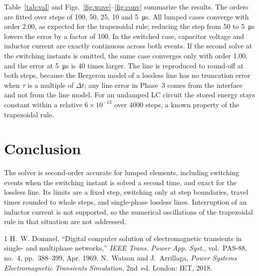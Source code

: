 \documentclass[conference]{IEEEtran}
\begin{document}
Table~\ref{tab:val} and Figs.~\ref{fig:wave}--\ref{fig:conv} summarize the results. The orders are fitted over steps of 100, 50, 25, 10 and \SI{5}{\micro\second}. All lumped cases converge with order 2.00, as expected for the trapezoidal rule; reducing the step from 50 to \SI{5}{\micro\second} lowers the error by a factor of 100. In the switched case, capacitor voltage and inductor current are exactly continuous across both events. If the second solve at the switching instants is omitted, the same case converges only with order 1.00, and the error at \SI{5}{\micro\second} is 40 times larger. The line is reproduced to round-off at both steps, because the Bergeron model of a lossless line has no truncation error when $\tau$ is a multiple of $\Delta t$; any line error in Phase~3 comes from the interface and not from the line model. For an undamped LC circuit the stored energy stays constant within a relative $6\times10^{-13}$ over 4000 steps, a known property of the trapezoidal rule.

\section{Conclusion}
The solver is second-order accurate for lumped elements, including switching events when the switching instant is solved a second time, and exact for the lossless line. Its limits are a fixed step, switching only at step boundaries, travel times rounded to whole steps, and single-phase lossless lines. Interruption of an inductor current is not supported, so the numerical oscillations of the trapezoidal rule in that situation are not addressed.

\begin{thebibliography}{1}
 H.~W. Dommel, ``Digital computer solution of electromagnetic transients in single- and multiphase networks,'' \emph{IEEE Trans. Power App. Syst.}, vol.~PAS-88, no.~4, pp.~388--399, Apr. 1969.
 N.~Watson and J.~Arrillaga, \emph{Power Systems Electromagnetic Transients Simulation}, 2nd~ed. London: IET, 2018.
\end{thebibliography}
\end{document}
